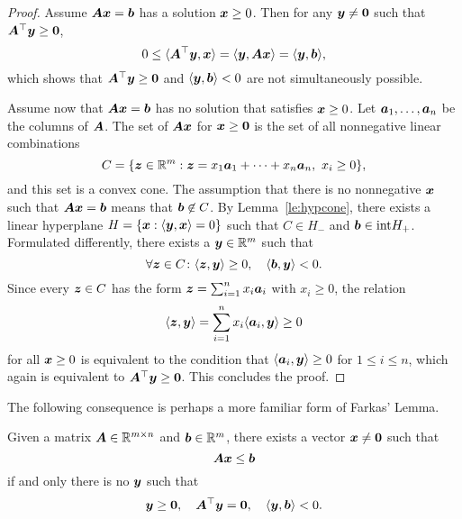\begin{proof}
Assume $\bm{A}\bm{x}=\bm{b}$ has a solution $\bm{x}\geq 0$. Then for any $\bm{y}\neq \bm{0}$ such that $\bm{A}^{\top}\bm{y}\geq \bm{0}$,
\begin{equation*}
 0\leq \langle {\bm{A}^{\top}\bm{y}}, {\bm{x}} \rangle=\langle {\bm{y}}, {\bm{A}\bm{x}} \rangle=\langle {\bm{y}}, {\bm{b}} \rangle,
\end{equation*}
which shows that $\bm{A}^{\top}\bm{y}\geq \bm{0}$ and $\langle {\bm{y}}, {\bm{b}} \rangle<0$ are not simultaneously possible. 

 Assume now that $\bm{A}\bm{x}=\bm{b}$ has no solution that satisfies $\bm{x}\geq 0$. Let $\bm{a}_1,\dots,\bm{a}_n$ be the columns of $\bm{A}$. The set of $\bm{A}\bm{x}$ for $\bm{x}\geq \bm{0}$ is the set
 of all nonnegative linear combinations
 \begin{equation*}
  C=\{\bm{z}\in \mathbb{R}^m \mathrel{\mathop{:}} \bm{z} = x_1\bm{a}_1+\cdots +x_n\bm{a}_n, \ x_i\geq 0\},
 \end{equation*}
and this set is a convex cone. The assumption that there is no nonnegative $\bm{x}$ such that $\bm{A}\bm{x}=\bm{b}$ means that $\bm{b}\not\in C$. By Lemma~\ref{le:hypcone}, there exists a linear hyperplane $H=\{\bm{x} \mathrel{\mathop{:}} \langle {\bm{y}}, {\bm{x}} \rangle=0\}$ such that $C\in H_-$ and $\bm{b}\in {\operatorname{int}} H_+$. Formulated differently, there exists a $\bm{y}\in \mathbb{R}^m$ such that
\begin{equation*}
 \forall \bm{z}\in C\colon \langle {\bm{z}}, {\bm{y}} \rangle\geq 0, \quad \langle {\bm{b}}, {\bm{y}} \rangle<0.
\end{equation*}
Since every $\bm{z}\in C$ has the form $\bm{z}=\sum_{i=1}^n x_i \bm{a}_i$ with $x_i\geq 0$, the relation
\begin{equation*}
 \langle {\bm{z}}, {\bm{y}} \rangle = \sum_{i=1}^n x_i\langle {\bm{a}_i}, {\bm{y}} \rangle\geq 0
\end{equation*}
for all $\bm{x}\geq 0$ is equivalent to the condition that $\langle {\bm{a}_i}, {\bm{y}} \rangle\geq 0$ for $1\leq i\leq n$, which again is equivalent to $\bm{A}^{\top}\bm{y}\geq \bm{0}$. This concludes the proof.
\end{proof}

The following consequence is perhaps a more familiar form of Farkas' Lemma.

\begin{corollary}
 Given a matrix $\bm{A}\in \mathbb{R}^{m\times n}$ and $\bm{b}\in \mathbb{R}^m$, there exists a vector $\bm{x}\neq \bm{0}$ such that 
 \begin{equation*}
  \bm{A}\bm{x}\leq \bm{b}
 \end{equation*}
if and only there is no $\bm{y}$ such that
\begin{equation*}
 \bm{y}\geq \bm{0}, \quad \bm{A}^{\top}\bm{y}=\bm{0}, \quad \langle {\bm{y}}, {\bm{b}} \rangle<0.
\end{equation*}

\end{corollary}


